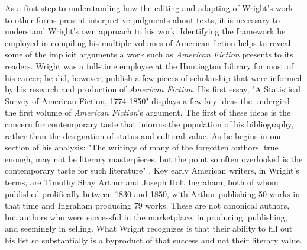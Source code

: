 As a first step to understanding how the editing and adapting of Wright's work to other forms present interpretive judgments about texts, it is necessary to understand Wright's own approach to his work. Identifying the framework he employed in compiling his multiple volumes of American fiction helps to reveal some of the implicit arguments a work such as \textit{American Fiction} presents to its readers. Wright was a full-time employee at the Huntington Library for most of his career; he did, however, publish a few pieces of scholarship that were informed by his research and production of \textit{American Fiction}. His first essay, "A Statistical Survey of American Fiction, 1774-1850" displays a few key ideas the undergird the first volume of \textit{American Fiction}'s argument. The first of these ideas is the concern for contemporary taste that informs the population of his bibliography, rather than the designation of status and cultural value. As he begins in one section of his analysis: "The writings of many of the forgotten authors, true enough, may not be literary masterpieces, but the point so often overlooked is the contemporary taste for such literature" \autocite[312]{wright_statistical_1939}. Key early American writers, in Wright's terms, are Timothy Shay Arthur and Joseph Holt Ingraham, both of whom published prolifically between 1830 and 1850, with Arthur publishing 50 works in that time and Ingraham producing 79 works. These are not canonical authors, but authors who were successful in the marketplace, in producing, publishing, and seemingly in selling. What Wright recognizes is that their ability to fill out his list so substantially is a byproduct of that success and not their literary value. 

